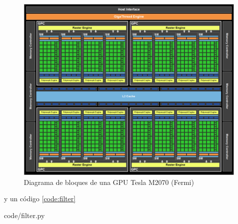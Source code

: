 \documentclass[twoside]{article}
\begin{document}

\begin{figure}
	\includegraphics[width=.45\textwidth]{block_diagram_Fermi}
	\caption{\label{fig:Fermi} Diagrama de bloques de una GPU Tesla M2070 (Fermi)}
\end{figure}

y un código \ref{code:filter}

%
   {code/filter.py}



\end{document}
